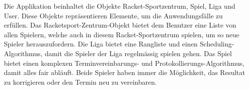 Die Applikation beinhaltet die Objekte Racket-Sportzentrum, Spiel, Liga und User. Diese Objekte repräsentieren Elemente, um die Anwendungsfälle zu erfüllen. Das Racketsport-Zentrum-Objekt bietet dem Benutzer eine Liste von allen Spielern, welche auch in diesem Racket-Sportzentrum spielen, um so neue Spieler herauszufordern. Die Liga bietet eine Rangliste und einen Scheduling-Algorithmus, damit die Spieler der Liga regelmässig spielen gehen. Das Spiel bietet einen komplexen Terminvereinbarungs- und Protokollierungs-Algorithmus, damit alles fair abläuft. Beide Spieler haben immer die Möglichkeit, das Resultat zu korrigieren oder den Termin neu zu vereinbaren. 